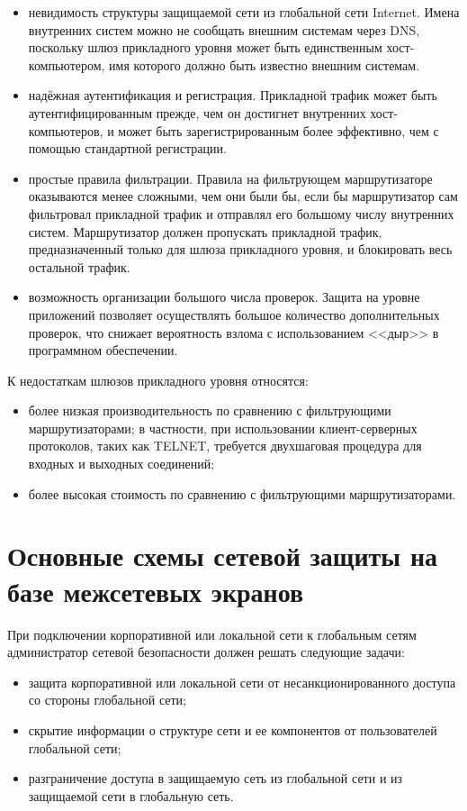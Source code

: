\begin{itemize}
\item невидимость структуры защищаемой сети из глобальной сети
    Internet. Имена внутренних систем можно не сообщать внешним
    системам через DNS, поскольку шлюз прикладного уровня может быть
    единственным хост-компьютером, имя которого должно быть известно
    внешним системам.
\item надёжная аутентификация и регистрация. Прикладной трафик
    может быть аутентифицированным прежде, чем он достигнет внутренних
    хост-компьютеров, и может быть зарегистрированным более
    эффективно, чем с помощью стандартной регистрации.
\item простые правила фильтрации. Правила на фильтрующем
    маршрутизаторе оказываются менее сложными, чем они были бы, если
    бы маршрутизатор сам фильтровал прикладной трафик и отправлял его
    большому числу внутренних систем. Маршрутизатор должен пропускать
    прикладной трафик, предназначенный только для шлюза прикладного
    уровня, и блокировать весь остальной трафик.
\item возможность организации большого числа проверок. Защита на
    уровне приложений позволяет осуществлять большое количество
    дополнительных проверок, что снижает вероятность взлома с
    использованием <<дыр>> в программном обеспечении.
\end{itemize}

К недостаткам шлюзов прикладного уровня относятся:
\begin{itemize}
\item более низкая производительность по сравнению с
    фильтрующими маршрутизаторами; в частности, при использовании
    клиент-серверных протоколов, таких как TELNET, требуется
    двухшаговая процедура для входных и выходных соединений;
\item  более высокая стоимость по сравнению с фильтрующими
    маршрутизаторами.
\end{itemize}

\chapter{Основные схемы сетевой защиты на базе межсетевых экранов}
При подключении корпоративной или локальной сети к глобальным сетям
администратор сетевой безопасности должен решать следующие задачи:

\begin{itemize}
\item  защита корпоративной или локальной сети от
    несанкционированного доступа со стороны глобальной сети;
\item скрытие информации о структуре сети и ее компонентов от
    пользователей глобальной сети;
\item  разграничение доступа в защищаемую сеть из глобальной
    сети и из защищаемой сети в глобальную сеть.
\end{itemize}

